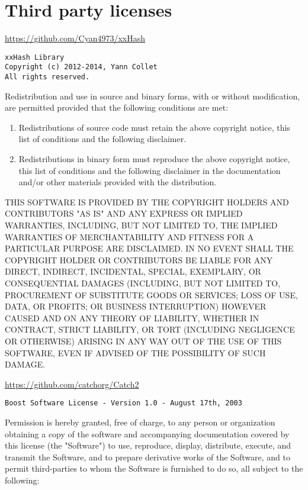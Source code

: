 \section{Third party licenses}

\begin{leftbar}
\noindent \uline{\url{https://github.com/Cyan4973/xxHash}}
\begin{verbatim}
xxHash Library
Copyright (c) 2012-2014, Yann Collet
All rights reserved.
\end{verbatim}
\end{leftbar}

Redistribution and use in source and binary forms, with or without modification, are permitted provided that the following conditions are met:

\begin{enumerate}
\item Redistributions of source code must retain the above copyright notice, this list of conditions and the following disclaimer.
\item Redistributions in binary form must reproduce the above copyright notice, this list of conditions and the following disclaimer in the documentation and/or other materials provided with the distribution.
\end{enumerate}

THIS SOFTWARE IS PROVIDED BY THE COPYRIGHT HOLDERS AND CONTRIBUTORS "AS IS" AND
ANY EXPRESS OR IMPLIED WARRANTIES, INCLUDING, BUT NOT LIMITED TO, THE IMPLIED
WARRANTIES OF MERCHANTABILITY AND FITNESS FOR A PARTICULAR PURPOSE ARE
DISCLAIMED. IN NO EVENT SHALL THE COPYRIGHT HOLDER OR CONTRIBUTORS BE LIABLE FOR
ANY DIRECT, INDIRECT, INCIDENTAL, SPECIAL, EXEMPLARY, OR CONSEQUENTIAL DAMAGES
(INCLUDING, BUT NOT LIMITED TO, PROCUREMENT OF SUBSTITUTE GOODS OR SERVICES;
LOSS OF USE, DATA, OR PROFITS; OR BUSINESS INTERRUPTION) HOWEVER CAUSED AND ON
ANY THEORY OF LIABILITY, WHETHER IN CONTRACT, STRICT LIABILITY, OR TORT
(INCLUDING NEGLIGENCE OR OTHERWISE) ARISING IN ANY WAY OUT OF THE USE OF THIS
SOFTWARE, EVEN IF ADVISED OF THE POSSIBILITY OF SUCH DAMAGE.

\begin{leftbar}
\noindent \uline{\url{https://github.com/catchorg/Catch2}}
\begin{verbatim}
Boost Software License - Version 1.0 - August 17th, 2003
\end{verbatim}
\end{leftbar}

Permission is hereby granted, free of charge, to any person or organization
obtaining a copy of the software and accompanying documentation covered by
this license (the "Software") to use, reproduce, display, distribute,
execute, and transmit the Software, and to prepare derivative works of the
Software, and to permit third-parties to whom the Software is furnished to
do so, all subject to the following: \\

